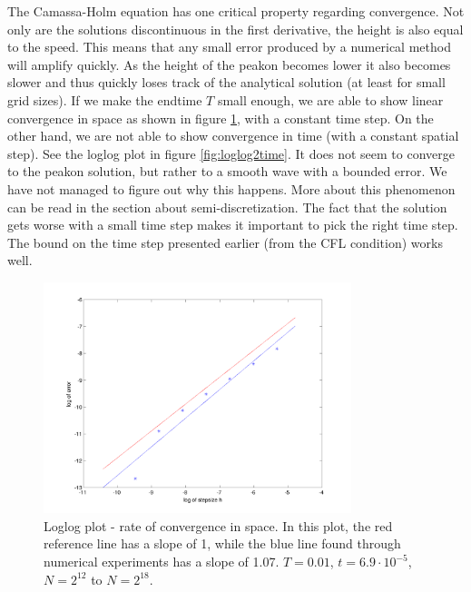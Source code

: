 The Camassa-Holm equation has one critical property regarding convergence. Not only are the solutions discontinuous in the first derivative, the height is also equal to the speed. This means that any small error produced by a numerical method will amplify quickly. As the height of the peakon becomes lower it also becomes slower and thus quickly loses track of the analytical solution (at least for small grid sizes). If we make the endtime $T$ small enough, we are able to show linear convergence in space as shown in figure \ref{fig:loglog2}, with a constant time step. On the other hand, we are not able to show convergence in time (with a constant spatial step). See the loglog plot in figure \ref{fig:loglog2time}. It does not seem to converge to the peakon solution, but rather to a smooth wave with a bounded error. We have not managed to figure out why this happens. More about this phenomenon can be read in the section about semi-discretization. The fact that the solution gets worse with a small time step makes it important to pick the right time step. The bound on the time step presented earlier (from the CFL condition) works well. 
 

\begin{figure}[h]
        \centering
        \includegraphics[width=0.8\textwidth]{gfx/loglog2}
        \caption{Loglog plot - rate of convergence in space. In this plot, the red reference line has a slope of 1, while the blue line found through numerical experiments has a slope of 1.07. $T = 0.01$, $t = 6.9 \cdot 10^{-5}$,$N = 2^{12}$ to $N = 2^{18}$.}
        \label{fig:loglog2}
\end{figure}

